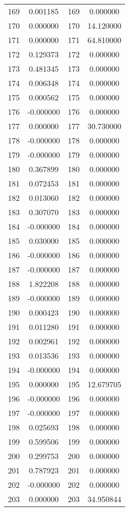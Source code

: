 \documentclass[12pt]{article}
\begin{document}
\begin{longtable}{@{}cccc@{}}
169 & 0.001185 & 169 & 0.000000 \\
170 & 0.000000 & 170 & 14.120000 \\
171 & 0.000000 & 171 & 64.810000 \\
172 & 0.129373 & 172 & 0.000000 \\
173 & 0.481345 & 173 & 0.000000 \\
174 & 0.006348 & 174 & 0.000000 \\
175 & 0.000562 & 175 & 0.000000 \\
176 & -0.000000 & 176 & 0.000000 \\
177 & 0.000000 & 177 & 30.730000 \\
178 & -0.000000 & 178 & 0.000000 \\
179 & -0.000000 & 179 & 0.000000 \\
180 & 0.367899 & 180 & 0.000000 \\
181 & 0.072453 & 181 & 0.000000 \\
182 & 0.013060 & 182 & 0.000000 \\
183 & 0.307070 & 183 & 0.000000 \\
184 & -0.000000 & 184 & 0.000000 \\
185 & 0.030000 & 185 & 0.000000 \\
186 & -0.000000 & 186 & 0.000000 \\
187 & -0.000000 & 187 & 0.000000 \\
188 & 1.822208 & 188 & 0.000000 \\
189 & -0.000000 & 189 & 0.000000 \\
190 & 0.000423 & 190 & 0.000000 \\
191 & 0.011280 & 191 & 0.000000 \\
192 & 0.002961 & 192 & 0.000000 \\
193 & 0.013536 & 193 & 0.000000 \\
194 & -0.000000 & 194 & 0.000000 \\
195 & 0.000000 & 195 & 12.679705 \\
196 & -0.000000 & 196 & 0.000000 \\
197 & -0.000000 & 197 & 0.000000 \\
198 & 0.025693 & 198 & 0.000000 \\
199 & 0.599506 & 199 & 0.000000 \\
200 & 0.299753 & 200 & 0.000000 \\
201 & 0.787923 & 201 & 0.000000 \\
202 & -0.000000 & 202 & 0.000000 \\
203 & 0.000000 & 203 & 34.950844 \\

\end{longtable}
\end{document}

